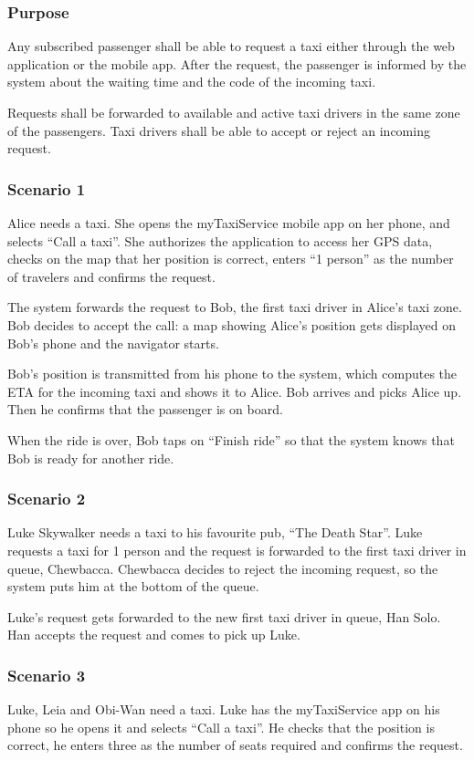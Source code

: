 \label{standard-call}
\subsubsection{Purpose}

Any subscribed passenger shall be able to request a taxi either through the web application or the mobile app.
After the request, the passenger is informed by the system about the waiting time and the code of the incoming taxi.

Requests shall be forwarded to available and active taxi drivers in the same zone of the passengers. Taxi drivers shall be able to accept or reject an incoming request.

\subsubsection{Scenario 1}
Alice needs a taxi. She opens the myTaxiService mobile app on her phone, and selects ``Call a taxi''. She authorizes the application to access her GPS data, checks on the map that her position is correct, enters ``1 person'' as the number of travelers and confirms the request.

The system forwards the request to Bob, the first taxi driver in Alice's taxi zone. Bob decides to accept the call: a map showing Alice's position gets displayed on Bob's phone and the navigator starts.

Bob's position is transmitted from his phone to the system, which computes the ETA for the incoming taxi and shows it to Alice. Bob arrives and picks Alice up. Then he confirms that the passenger is on board.

When the ride is over, Bob taps on ``Finish ride'' so that the system knows that Bob is ready for another ride.

\subsubsection{Scenario 2}
Luke Skywalker needs a taxi to his favourite pub, ``The Death Star''.
Luke requests a taxi for 1 person and the request is forwarded to the first taxi driver in queue, Chewbacca. Chewbacca decides to reject the incoming request, so the system puts him at the bottom of the queue.

Luke's request gets forwarded to the new first taxi driver in queue, Han Solo. Han accepts the request and comes to pick up Luke.

\subsubsection{Scenario 3}
Luke, Leia and Obi-Wan need a taxi. Luke has the myTaxiService app on his phone so he opens it and selects ``Call a taxi''. He checks that the position is correct, he enters three as the number of seats required and confirms the request.

